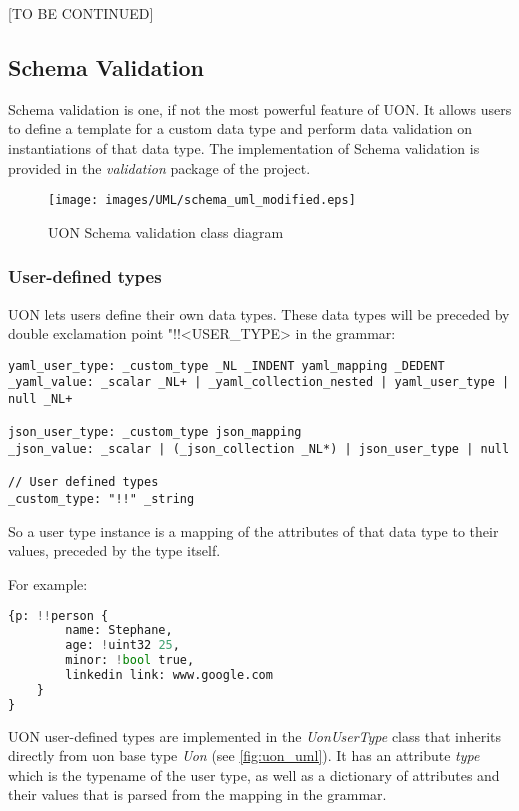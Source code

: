 \documentclass[12pt]{article}
\begin{document}
[TO BE CONTINUED]

\pagebreak

\subsection{Schema Validation}
Schema validation is one, if not the most powerful feature of UON. It allows users to define a template for a custom data type and perform data validation on instantiations of that data type. The implementation of Schema validation is provided in the \emph{validation} package of the project.

\begin{figure}[ht!]
 	\centering
 	\caption{UON Schema validation class diagram}
 	\texttt{[image: images/UML/schema\_uml\_modified.eps]}
 	\label{fig:uon_units_uml}
\end{figure}

\subsubsection{User-defined types}
UON lets users define their own data types. These data types will be preceded by double exclamation point "!!<USER\_TYPE> in the grammar:

\begin{lstlisting}
yaml_user_type: _custom_type _NL _INDENT yaml_mapping _DEDENT
_yaml_value: _scalar _NL+ | _yaml_collection_nested | yaml_user_type | null _NL+

json_user_type: _custom_type json_mapping
_json_value: _scalar | (_json_collection _NL*) | json_user_type | null

// User defined types
_custom_type: "!!" _string
\end{lstlisting}

So a user type instance is a mapping of the attributes of that data type to their values, preceded by the type itself.

For example:
\begin{lstlisting}[language=Python]
{p: !!person {
        name: Stephane, 
        age: !uint32 25,
        minor: !bool true,
        linkedin link: www.google.com
    }
}
\end{lstlisting}

UON user-defined types are implemented in the \emph{UonUserType} class that inherits directly from uon base type \emph{Uon} (see \ref{fig:uon_uml}). It has an attribute \emph{type} which is the typename of the user type, as well as a dictionary of attributes and their values that is parsed from the mapping in the grammar.
\end{document}
